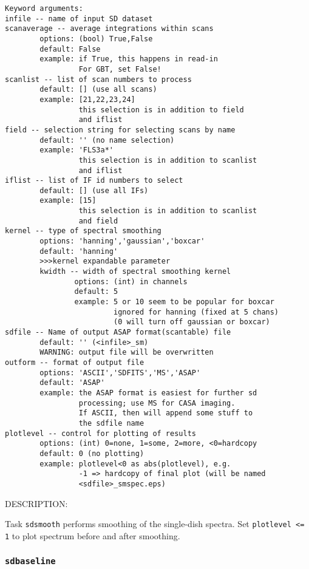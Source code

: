 \begin{verbatim}
Keyword arguments:
infile -- name of input SD dataset
scanaverage -- average integrations within scans
        options: (bool) True,False
        default: False
        example: if True, this happens in read-in
                 For GBT, set False!
scanlist -- list of scan numbers to process
        default: [] (use all scans)
        example: [21,22,23,24]
                 this selection is in addition to field
                 and iflist
field -- selection string for selecting scans by name
        default: '' (no name selection)
        example: 'FLS3a*'
                 this selection is in addition to scanlist
                 and iflist
iflist -- list of IF id numbers to select
        default: [] (use all IFs)
        example: [15]
                 this selection is in addition to scanlist
                 and field
kernel -- type of spectral smoothing
        options: 'hanning','gaussian','boxcar'
        default: 'hanning'
        >>>kernel expandable parameter
        kwidth -- width of spectral smoothing kernel
                options: (int) in channels
                default: 5
                example: 5 or 10 seem to be popular for boxcar
                         ignored for hanning (fixed at 5 chans)
                         (0 will turn off gaussian or boxcar)
sdfile -- Name of output ASAP format(scantable) file
        default: '' (<infile>_sm)
        WARNING: output file will be overwritten
outform -- format of output file
        options: 'ASCII','SDFITS','MS','ASAP'
        default: 'ASAP'
        example: the ASAP format is easiest for further sd
                 processing; use MS for CASA imaging.
                 If ASCII, then will append some stuff to
                 the sdfile name
plotlevel -- control for plotting of results
        options: (int) 0=none, 1=some, 2=more, <0=hardcopy
        default: 0 (no plotting)
        example: plotlevel<0 as abs(plotlevel), e.g.
                 -1 => hardcopy of final plot (will be named
                 <sdfile>_smspec.eps)
\end{verbatim}

    DESCRIPTION:

    Task {\tt sdsmooth} performs smoothing of the single-dish spectra.
    Set {\tt plotlevel <= 1} to plot spectrum before and after smoothing.

    
\subsubsection{{\tt sdbaseline}}
\label{section:sd.sdtasks.tasks.sdbaseline}

